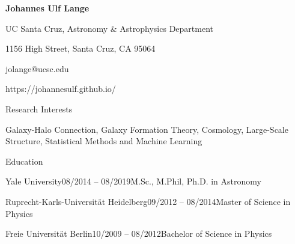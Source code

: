 \documentclass[11pt]{resume} %
\begin{document}
\centerline{\color{blue} \LARGE \bf Johannes Ulf Lange}
\centerline{UC Santa Cruz, Astronomy \& Astrophysics Department}
\centerline{1156 High Street, Santa Cruz, CA 95064}
\centerline{jolange@ucsc.edu}
\centerline{https://johannesulf.github.io/}
\medskip

\begin{rSection}{Research Interests}
  \begin{adjustwidth}{0.5cm}{}
    Galaxy-Halo Connection, Galaxy Formation Theory, Cosmology, Large-Scale Structure, Statistical Methods and Machine Learning
  \end{adjustwidth}
\end{rSection}

\begin{rSection}{Education}
  \begin{adjustwidth}{0.5cm}{}
    \begin{rSubsection}{Yale University}{08/2014 -- 08/2019}{M.Sc., M.Phil, Ph.D. in Astronomy}{}\end{rSubsection}

    \begin{rSubsection}{Ruprecht-Karls-Universität Heidelberg}{09/2012 -- 08/2014}{Master of Science in Physics}{}\end{rSubsection}

    \begin{rSubsection}{Freie Universität Berlin}{10/2009 -- 08/2012}{Bachelor of Science in Physics}{}\end{rSubsection}
  \end{adjustwidth}
\end{rSection}
\end{document}
